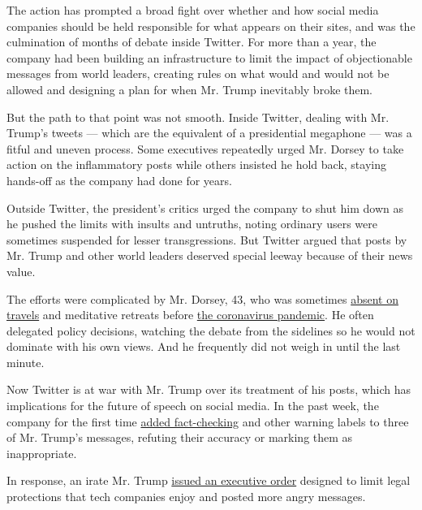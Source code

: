 The action has prompted a broad fight over whether and how social media
companies should be held responsible for what appears on their sites,
and was the culmination of months of debate inside Twitter. For more
than a year, the company had been building an infrastructure to limit
the impact of objectionable messages from world leaders, creating rules
on what would and would not be allowed and designing a plan for when Mr.
Trump inevitably broke them.

But the path to that point was not smooth. Inside Twitter, dealing with
Mr. Trump's tweets --- which are the equivalent of a presidential
megaphone --- was a fitful and uneven process. Some executives
repeatedly urged Mr. Dorsey to take action on the inflammatory posts
while others insisted he hold back, staying hands-off as the company had
done for years.

Outside Twitter, the president's critics urged the company to shut him
down as he pushed the limits with insults and untruths, noting ordinary
users were sometimes suspended for lesser transgressions. But Twitter
argued that posts by Mr. Trump and other world leaders deserved special
leeway because of their news value.

The efforts were complicated by Mr. Dorsey, 43, who was sometimes
\href{https://www.nytimes3xbfgragh.onion/2020/02/29/business/dealbook/elliott-twitter-jack-dorsey.html}{absent
on travels} and meditative retreats before
\href{https://www.nytimes3xbfgragh.onion/news-event/coronavirus?action=click\&pgtype=Article\&state=default\&module=styln-coronavirus-national\&variant=show\&region=TOP_BANNER\&context=storylines_menu}{the
coronavirus pandemic}. He often delegated policy decisions, watching the
debate from the sidelines so he would not dominate with his own views.
And he frequently did not weigh in until the last minute.

Now Twitter is at war with Mr. Trump over its treatment of his posts,
which has implications for the future of speech on social media. In the
past week, the company for the first time
\href{https://www.nytimes3xbfgragh.onion/2020/05/26/technology/twitter-trump-mail-in-ballots.html}{added
fact-checking} and other warning labels to three of Mr. Trump's
messages, refuting their accuracy or marking them as inappropriate.

In response, an irate Mr. Trump
\href{https://www.nytimes3xbfgragh.onion/2020/05/28/us/politics/trump-jack-dorsey.html}{issued
an executive order} designed to limit legal protections that tech
companies enjoy and posted more angry messages.

